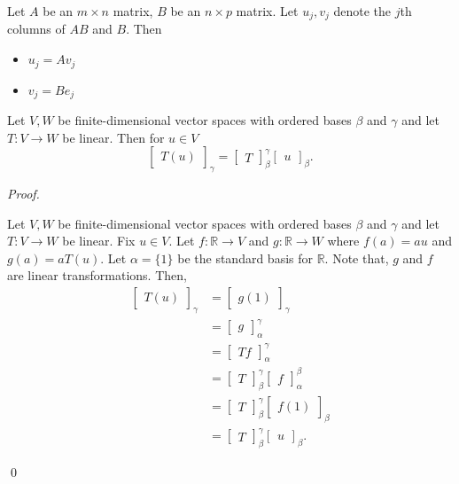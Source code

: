 \documentclass[12pt]{article}
\newenvironment{theorem}[2][Theorem]{\begin{trivlist}
\item[\hskip \labelsep {\bfseries #1}\hskip \labelsep {\bfseries #2.}]}{\end{trivlist}}
\newenvironment{sol}
    {\emph{Proof.}
    }
    {
    \qed
    }
\begin{document}
\begin{theorem}{2.13}
Let $A$ be an $m \times n$ matrix, $B$ be an $n \times p$ matrix. Let $u_j, v_j$ denote the $j$th columns of $AB$ and $B$. Then 

\begin{itemize}
    \item[(a)] $u_j = Av_j$
    \item[(b)] $v_j = Be_j$
\end{itemize}
\end{theorem}

\begin{theorem}{2.14}
Let $V,W$ be finite-dimensional vector spaces with ordered bases $\beta$ and $\gamma$ and let $T : V \to W$ be linear. Then for $u \in V$ $$\begin{bmatrix} T(u) \end{bmatrix}_\gamma = \begin{bmatrix} T \end{bmatrix}_\beta^\gamma\begin{bmatrix} u \end{bmatrix}_\beta.$$
\end{theorem}

\begin{sol}
Let $V,W$ be finite-dimensional vector spaces with ordered bases $\beta$ and $\gamma$ and let $T : V \to W$ be linear. Fix $u \in V$. Let $f : \mathbb{R} \to V$ and $g : \mathbb{R} \to W$ where $f(a) = au$ and $g(a) = aT(u)$. Let $\alpha = \{1\}$ be the standard basis for $\mathbb{R}$. Note that, $g$ and $f$ are linear transformations. Then,
\begin{align*}
    \begin{bmatrix}
T(u)
\end{bmatrix}_\gamma &= \begin{bmatrix}
g(1)
\end{bmatrix}_\gamma \\
&= \begin{bmatrix}
g
\end{bmatrix}_\alpha^\gamma \\
&= \begin{bmatrix}
Tf
\end{bmatrix}_\alpha^\gamma \\
&= \begin{bmatrix}
T
\end{bmatrix}_\beta^\gamma\begin{bmatrix}
f
\end{bmatrix}_\alpha^\beta \\
&= \begin{bmatrix}
T
\end{bmatrix}_\beta^\gamma \begin{bmatrix}
f(1)
\end{bmatrix}_\beta \\
&= \begin{bmatrix}
T
\end{bmatrix}_\beta^\gamma \begin{bmatrix}
u
\end{bmatrix}_\beta.
\end{align*}
\end{sol}
\end{document}
